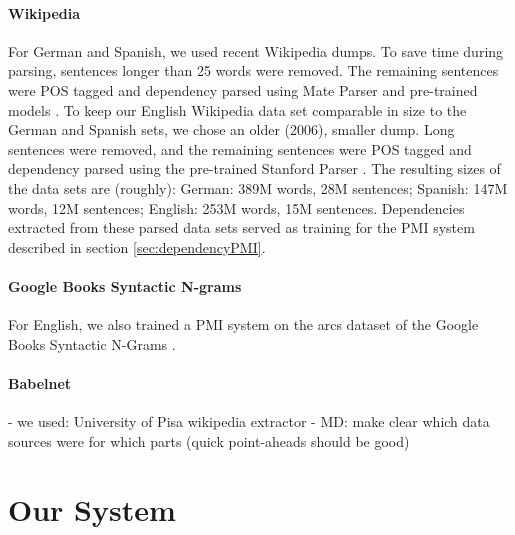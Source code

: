 \documentclass[11pt]{article}
\begin{document}
\paragraph{Wikipedia} %
For German and Spanish, we used recent Wikipedia dumps. To save time during parsing, sentences longer than 25 words were removed. The remaining sentences were POS tagged and dependency parsed using Mate Parser and pre-trained models \cite{bohnet:10,bohnet:kuhn:12,seeker:kuhn:13}. To keep our English Wikipedia data set comparable in size to the German and Spanish sets, we chose an older (2006), smaller dump. Long sentences were removed, and the remaining sentences were POS tagged and dependency parsed using the pre-trained Stanford Parser \cite{klein:manning:03,marneffe:maccartney:ea:06}. The resulting sizes of the data sets are (roughly): German: 389M words, 28M sentences; Spanish: 147M words, 12M sentences; English: 253M words, 15M sentences. Dependencies extracted from these parsed data sets served as training for the PMI system described in section \ref{sec:dependencyPMI}.

\paragraph{Google Books Syntactic N-grams}
For English, we also trained a PMI system on the arcs dataset of the Google Books Syntactic N-Grams \cite{goldberg:orwant:13}.%

\paragraph{Babelnet} %

- we used: University of Pisa wikipedia extractor
- MD: make clear which data sources were for which parts (quick point-aheads should be good)

\section{Our  System}
\end{document}
